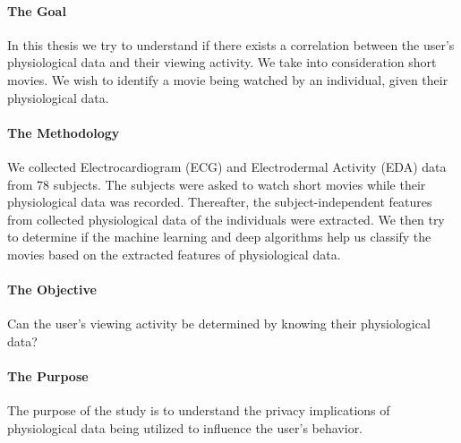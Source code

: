 \paragraph{The Goal} In this thesis we try to understand if there exists a correlation between the user's physiological data and their viewing activity. We take into consideration short movies. We wish to identify a movie being watched by an individual, given their physiological data.

\paragraph{The Methodology} \label{sec:the_methodology} We collected Electrocardiogram (ECG) and Electrodermal Activity (EDA) data from 78 subjects. The subjects were asked to watch short movies while their physiological data was recorded. Thereafter, the subject-independent features from collected physiological data of the individuals were extracted. We then try to determine if the machine learning and deep algorithms help us classify the movies based on the extracted features of physiological data.

\paragraph{The Objective} Can the user's viewing activity be determined by knowing their physiological data?

\paragraph{The Purpose} The purpose of the study is to understand the privacy implications of physiological data being utilized to influence the user's behavior.

